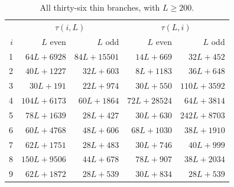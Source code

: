 \begin{table}[ht]\centering
\begin{tabular}{rrrrr}
\toprule
& \multicolumn{2}{c}{$\tau(i,L)$} & \multicolumn{2}{c}{$\tau(L,i)$}\\
$i$ & $L$ even & $L$ odd & $L$ even & $L$ odd\\
\midrule
1 & $64L+6928$ & $84L+15501$ & $14L+669$ & $32L+452$\\
2 & $40L+1227$ & $32L+603$ & $8L+1183$ & $36L+648$\\
3 & $30L+191$ & $22L+974$ & $30L+550$ & $110L+3592$\\
4 & $104L+6173$ & $60L+1864$ & $72L+28524$ & $64L+3814$\\
5 & $78L+1639$ & $28L+427$ & $30L+630$ & $242L+8703$\\
6 & $60L+4768$ & $48L+606$ & $68L+1030$ & $38L+1910$\\
7 & $62L+1751$ & $28L+483$ & $30L+746$ & $40L+999$\\
8 & $150L+9506$ & $44L+678$ & $78L+907$ & $38L+2034$\\
9 & $62L+1872$ & $28L+539$ & $30L+834$ & $28L+539$\\
\bottomrule\end{tabular}
\caption{All thirty-six thin branches, with $L\ge200$.}\label{frame:tab:thin}
\end{table}

